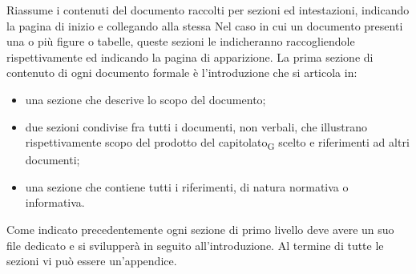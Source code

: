     Riassume i contenuti del documento raccolti per sezioni ed intestazioni, indicando la pagina di inizio e collegando alla stessa
    Nel caso in cui un documento presenti una o più figure o tabelle, queste sezioni le indicheranno raccogliendole rispettivamente ed indicando la pagina di apparizione.
    La prima sezione di contenuto di ogni documento formale è l'introduzione che si articola in:
    \begin{itemize}
        \item una sezione che descrive lo scopo del documento;
        \item due sezioni condivise fra tutti i documenti, non verbali, che illustrano rispettivamente scopo del prodotto del capitolato\textsubscript{G} scelto e riferimenti ad altri documenti;
        \item una sezione che contiene tutti i riferimenti, di natura normativa o informativa.
    \end{itemize}
    Come indicato precedentemente ogni sezione di primo livello deve avere un suo file dedicato e si svilupperà in seguito all'introduzione. Al termine di tutte le sezioni vi può essere un'appendice.

